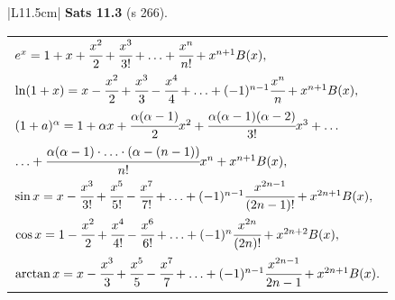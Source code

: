 \documentclass[a4paper]{article}
\begin{document}
\begin{tabular}{|L{11.5cm}|} \hline
\textbf{Sats 11.3} (s 266).
\begin{center}
\begin{tabular}{l}
\vspace{0.3cm}
$e^x=1+x+\cfrac{x^2}{2}+\cfrac{x^3}{3!}+\ldots+\cfrac{x^n}{n!}+x^{n+1}B(x),$ \\\vspace{0.3cm}
$\ln(1+x)=x-\cfrac{x^2}{2}+\cfrac{x^3}{3}-\cfrac{x^4}{4}+\ldots+(-1)^{n-1}\cfrac{x^n}{n}+x^{n+1}B(x),$ \\\vspace{0.3cm}
$(1+a)^\alpha=1+\alpha x+\cfrac{\alpha(\alpha-1)}{2}x^2+\cfrac{\alpha(\alpha-1)(\alpha-2)}{3!}x^3+\ldots$\\\vspace{0.3cm}
\hspace{1.5cm}$\ldots+\cfrac{\alpha(\alpha-1)\cdot\ldots\cdot(\alpha-(n-1))}{n!}x^n+x^{n+1}B(x),$\\\vspace{0.3cm}
$\sin{x}=x-\cfrac{x^3}{3!}+\cfrac{x^5}{5!}-\cfrac{x^7}{7!}+\ldots+(-1)^{n-1}\cfrac{x^{2n-1}}{(2n-1)!}+x^{2n+1}B(x),$\\\vspace{0.3cm}
$\cos{x}=1-\cfrac{x^2}{2}+\cfrac{x^4}{4!}-\cfrac{x^6}{6!}+\ldots+(-1)^{n}\cfrac{x^{2n}}{(2n)!}+x^{2n+2}B(x),$\\\vspace{0.3cm}
$\arctan{x}=x-\cfrac{x^3}{3}+\cfrac{x^5}{5}-\cfrac{x^7}{7}+\ldots+(-1)^{n-1}\cfrac{x^{2n-1}}{2n-1}+x^{2n+1}B(x).$\\
\end{tabular}
\end{center}
\\\hline
\end{tabular}
\\\\\\
\end{document}
